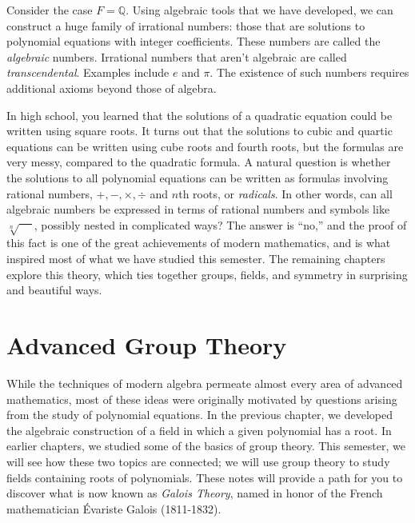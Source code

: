 Consider the case \(F = \mathbb{Q}\). Using algebraic tools that we have developed, we can construct a huge family of irrational numbers: those that are solutions to polynomial equations with integer coefficients. These numbers are called the \textit{algebraic} numbers. Irrational numbers that aren't algebraic are called \textit{transcendental}. Examples include \(e\) and \(\pi\). The existence of such numbers requires additional axioms beyond those of algebra.

In high school, you learned that the solutions of a quadratic equation could be written using square roots. It turns out that the solutions to cubic and quartic equations can be written using cube roots and fourth roots, but the formulas are very messy, compared to the quadratic formula. A natural question is whether the solutions to all polynomial equations can be written as formulas involving rational numbers, $+,-,\times,\div$ and $n$th roots, or \textit{radicals}. In other words, can all algebraic numbers be expressed in terms of rational numbers and symbols like \(\sqrt[n]{\phantom{xx}}\), possibly nested in complicated ways? The answer is ``no,'' and the proof of this fact is one of the great achievements of modern mathematics, and is what inspired most of what we have studied this semester. The remaining chapters explore this theory, which ties together groups, fields, and symmetry in surprising and beautiful ways.
\begin{annotation}
\end{annotation}


\chapter{Advanced Group Theory}

While the techniques of modern algebra permeate almost every area of advanced mathematics, most of these ideas were originally motivated by questions arising from the study of polynomial equations. In the previous chapter, we developed the algebraic construction of a field in which a given polynomial has a root. In earlier chapters, we studied some of the basics of group theory. This semester, we will see how these two topics are connected; we will use group theory to study fields containing roots of polynomials. These notes will provide a path for you to discover what is now known as \textit{Galois Theory}, named in honor of the French mathematician \'{E}variste Galois (1811-1832).

